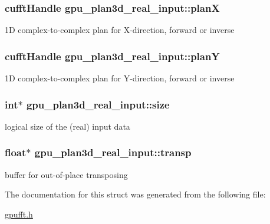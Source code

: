 \hypertarget{structgpu__plan3d__real__input_a57752f1567bc689ad71d8e3e8017ec4a}{
\subsubsection[{planX}]{\setlength{\rightskip}{0pt plus 5cm}cufftHandle {\bf gpu\_\-plan3d\_\-real\_\-input::planX}}}
\label{structgpu__plan3d__real__input_a57752f1567bc689ad71d8e3e8017ec4a}


1D complex-\/to-\/complex plan for X-\/direction, forward or inverse 

\hypertarget{structgpu__plan3d__real__input_a7721fe049fc152d3bc0ade13c4f4426b}{
\subsubsection[{planY}]{\setlength{\rightskip}{0pt plus 5cm}cufftHandle {\bf gpu\_\-plan3d\_\-real\_\-input::planY}}}
\label{structgpu__plan3d__real__input_a7721fe049fc152d3bc0ade13c4f4426b}


1D complex-\/to-\/complex plan for Y-\/direction, forward or inverse 

\hypertarget{structgpu__plan3d__real__input_a49f751412da8ff594dd2f0275a4d8a21}{
\subsubsection[{size}]{\setlength{\rightskip}{0pt plus 5cm}int$\ast$ {\bf gpu\_\-plan3d\_\-real\_\-input::size}}}
\label{structgpu__plan3d__real__input_a49f751412da8ff594dd2f0275a4d8a21}


logical size of the (real) input data 

\hypertarget{structgpu__plan3d__real__input_ac51425f669e3169308d1b1126008ee09}{
\subsubsection[{transp}]{\setlength{\rightskip}{0pt plus 5cm}float$\ast$ {\bf gpu\_\-plan3d\_\-real\_\-input::transp}}}
\label{structgpu__plan3d__real__input_ac51425f669e3169308d1b1126008ee09}


buffer for out-\/of-\/place transposing 



The documentation for this struct was generated from the following file:\begin{DoxyCompactItemize}
\item 
\hyperlink{gpufft_8h}{gpufft.h}\end{DoxyCompactItemize}
